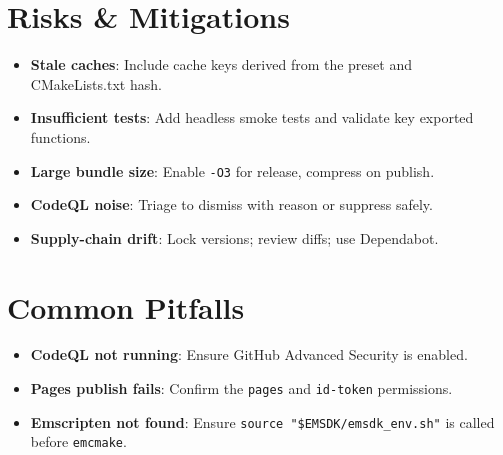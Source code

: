 \documentclass[11pt]{article}
\begin{document}
\section{Risks \& Mitigations}

\begin{itemize}
  \item \textbf{Stale caches}: Include cache keys derived from the preset and CMakeLists.txt hash.
  \item \textbf{Insufficient tests}: Add headless smoke tests and validate key exported functions.
  \item \textbf{Large bundle size}: Enable \texttt{-O3} for release, compress on publish.
  \item \textbf{CodeQL noise}: Triage to dismiss with reason or suppress safely.
  \item \textbf{Supply-chain drift}: Lock versions; review diffs; use Dependabot.
\end{itemize}

\section{Common Pitfalls}

\begin{itemize}
  \item \textbf{CodeQL not running}: Ensure GitHub Advanced Security is enabled.
  \item \textbf{Pages publish fails}: Confirm the \texttt{pages} and \texttt{id-token} permissions.
  \item \textbf{Emscripten not found}: Ensure \texttt{source "\$EMSDK/emsdk\_env.sh"} is called before \texttt{emcmake}.
\end{itemize}
\end{document}
